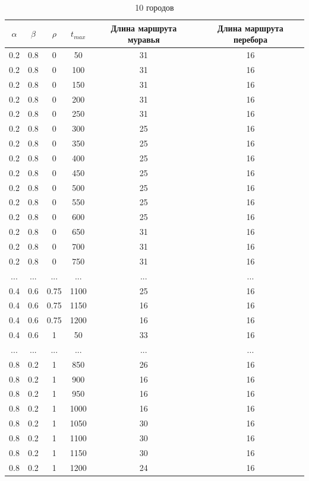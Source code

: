 \documentclass[a4paper,12pt]{article}
\begin{document}
\begin{table}[H]
    \centering
    \caption{10 городов}
    \label{table:city10}
    \begin{tabular}{|c|c|c|c|c|c|}
        \hline
        $\alpha$ & $\beta$ & $\rho$ & $t_{max}$ & Длина маршрута муравья & Длина маршрута перебора \\
        \hline
        0.2 & 0.8 & 0 & 50 & 31 & 16 \\
        0.2 & 0.8 & 0 & 100 & 31 & 16 \\
        0.2 & 0.8 & 0 & 150 & 31 & 16 \\
        0.2 & 0.8 & 0 & 200 & 31 & 16 \\
        0.2 & 0.8 & 0 & 250 & 31 & 16 \\
        0.2 & 0.8 & 0 & 300 & 25 & 16 \\
        0.2 & 0.8 & 0 & 350 & 25 & 16 \\
        0.2 & 0.8 & 0 & 400 & 25 & 16 \\
        0.2 & 0.8 & 0 & 450 & 25 & 16 \\
        0.2 & 0.8 & 0 & 500 & 25 & 16 \\
        0.2 & 0.8 & 0 & 550 & 25 & 16 \\
        0.2 & 0.8 & 0 & 600 & 25 & 16 \\
        0.2 & 0.8 & 0 & 650 & 31 & 16 \\
        0.2 & 0.8 & 0 & 700 & 31 & 16 \\
        0.2 & 0.8 & 0 & 750 & 31 & 16 \\
        ... & ... & ... & ... & ... & ... \\
        0.4 & 0.6 & 0.75 & 1100 & 25 & 16 \\
        0.4 & 0.6 & 0.75 & 1150 & 16 & 16 \\
        0.4 & 0.6 & 0.75 & 1200 & 16 & 16 \\
        0.4 & 0.6 & 1 & 50 & 33 & 16 \\
        ... & ... & ... & ... & ... & ...\\
        0.8 & 0.2 & 1 & 850 & 26 & 16 \\
        0.8 & 0.2 & 1 & 900 & 16 & 16 \\
        0.8 & 0.2 & 1 & 950 & 16 & 16 \\
        0.8 & 0.2 & 1 & 1000 & 16 & 16 \\
        0.8 & 0.2 & 1 & 1050 & 30 & 16 \\
        0.8 & 0.2 & 1 & 1100 & 30 & 16 \\
        0.8 & 0.2 & 1 & 1150 & 30 & 16 \\
        0.8 & 0.2 & 1 & 1200 & 24 & 16 \\
        \hline
    \end{tabular}
\end{table}
\end{document}
